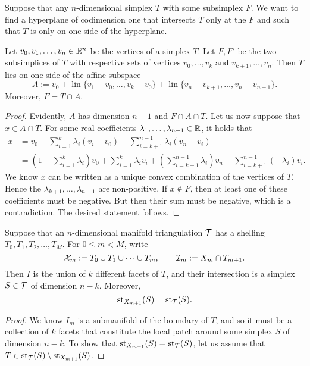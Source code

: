 \documentclass[12pt,a4paper]{article}
\begin{document}
Suppose that any $n$-dimensional simplex $T$ with some subsimplex $F$.
We want to find a hyperplane of codimension one that intersects $T$ only at the $F$ and such that $T$ is only on one side of the hyperplane. 

\begin{lemma}\label{lemma:oppositesubsimplex}
    Let $v_0, v_1, \dots, v_n \in {\mathbb R}^n$ be the vertices of a simplex $T$.
    Let $F, F'$ be the two subsimplices of $T$ with respective sets of vertices $v_0,\dots,v_k$ and $v_{k+1},\dots,v_n$.
    Then $T$ lies on one side of the affine subspace
    \[
        A := v_0 + \operatorname{lin}\{ v_1 - v_0, \dots, v_k - v_0 \} +  \operatorname{lin}\{ v_n - v_{k+1}, \dots, v_n - v_{n-1} \}.
    \]
    Moreover, $F = T \cap A$.
\end{lemma}
\begin{proof}
    Evidently, $A$ has dimension $n-1$ and $F \cap A \cap T$.
    Let us now suppose that $x \in A \cap T$.
    For some real coefficients $\lambda_1,\dots,\lambda_{n-1} \in {\mathbb R}$, it holds that 
    \begin{align}
        x &= 
        v_0 + \sum_{i=1}^{k} \lambda_{i} ( v_i - v_0 ) + \sum_{i=k+1}^{n-1} \lambda_{i} ( v_n - v_i )
        \\&
        = 
        \left( 1 - \sum_{i=1}^{k} \lambda_{i} \right) v_0 
        + 
        \sum_{i=1  }^{k  } \lambda_{i} v_i 
        + 
        \left( \sum_{i=k+1}^{n-1} \lambda_{i} \right) v_n
        + 
        \sum_{i=k+1}^{n-1} (-\lambda_{i}) v_i 
        .
    \end{align}
    We know $x$ can be written as a unique convex combination of the vertices of $T$.
    Hence the $\lambda_{k+1}, \dots, \lambda_{n-1}$ are non-positive. 
    If $x \notin F$, then at least one of these coefficients must be negative. 
    But then their sum must be negative, which is a contradiction. 
    The desired statement follows.         
\end{proof}






\begin{lemma}    
    Suppose that an $n$-dimensional manifold triangulation ${\mathcal T}$ has a shelling $T_{0}, T_{1}, T_{2}, \dots, T_{M}$.
    For $0 \leq m < M$, write 
    $$
        {\mathcal X}_{m} := T_{0} \cup T_{1} \cup \dots \cup T_{m},
        \qquad 
        {\mathcal I}_{m} := X_{m} \cap T_{m+1}.
    $$ 
    Then $I$ is the union of $k$ different facets of $T$, 
    and their intersection is a simplex $S \in {\mathcal T}$ of dimension $n-k$.
    Moreover, 
    $$
        \operatorname{st}_{X_{m+1}}(S) = \operatorname{st}_{{\mathcal T}}(S).
    $$
\end{lemma}
\begin{proof}
    We know $I_{m}$ is a submanifold of the boundary of $T$, and so it must be a collection of $k$ facets
    that constitute the local patch around some simplex $S$ of dimension $n-k$.
    To show that $\operatorname{st}_{X_{m+1}}(S) = \operatorname{st}_{{\mathcal T}}(S)$, let us assume that $T \in \operatorname{st}_{{\mathcal T}}(S) \setminus \operatorname{st}_{X_{m+1}}(S)$.
\end{proof}
\end{document}
